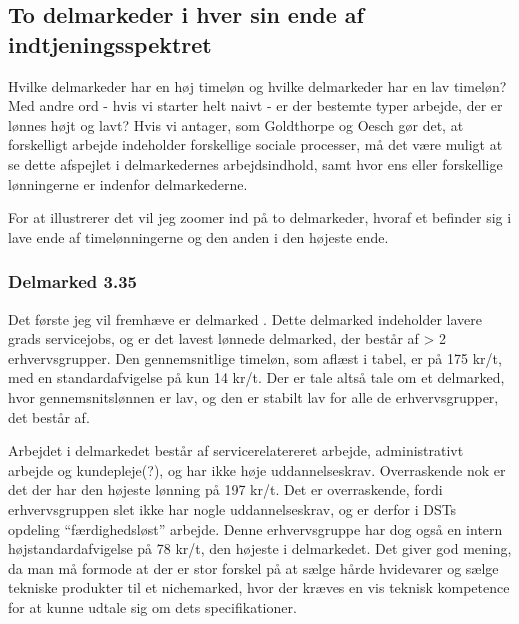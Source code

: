 
%
\subsection{To delmarkeder i hver sin ende af indtjeningsspektret}
%

Hvilke delmarkeder har en høj timeløn og hvilke delmarkeder har en lav timeløn? Med andre ord - hvis vi starter helt naivt - er der bestemte typer arbejde, der er lønnes højt og lavt? Hvis vi antager, som Goldthorpe og Oesch gør det, at forskelligt arbejde indeholder forskellige sociale processer, må det være muligt at se dette afspejlet i delmarkedernes arbejdsindhold, samt hvor ens eller forskellige lønningerne er indenfor delmarkederne. 

 For at illustrerer det vil jeg zoomer ind på to delmarkeder, hvoraf et befinder sig i lave ende af timelønningerne og den anden i den højeste ende.

%
\subsubsection{Delmarked 3.35}
%



 Det første jeg vil fremhæve er delmarked . Dette delmarked indeholder lavere grads servicejobs, og er det lavest lønnede delmarked, der består af > 2 erhvervsgrupper. Den gennemsnitlige timeløn, som aflæst i tabel, er på 175 kr/t, med en standardafvigelse på kun 14 kr/t. Der er tale altså tale om et delmarked, hvor gennemsnitslønnen er lav, og den er stabilt lav for alle de erhvervsgrupper, det består af. 

Arbejdet i delmarkedet består af servicerelatereret arbejde, administrativt arbejde og kundepleje(?), og har ikke høje uddannelseskrav. Overraskende nok er det  der har den højeste lønning på 197 kr/t. Det er overraskende, fordi erhvervsgruppen slet ikke har nogle uddannelseskrav, og er derfor i DSTs opdeling “færdighedsløst” arbejde. Denne erhvervsgruppe har dog også en intern højstandardafvigelse på 78 kr/t, den højeste i delmarkedet. Det giver god mening, da man må formode at der er stor forskel på at sælge hårde hvidevarer og sælge tekniske produkter til et nichemarked, hvor der kræves en vis teknisk kompetence for at kunne udtale sig om dets specifikationer. 

